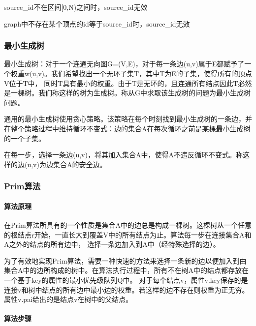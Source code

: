 \begin{DoxyItemize}
\item {\ttfamily source\+\_\+id}不在区间{\ttfamily \mbox{[}0,N)}之间时，{\ttfamily source\+\_\+id}无效
\item {\ttfamily graph}中不存在某个顶点的{\ttfamily id}等于{\ttfamily source\+\_\+id}时，{\ttfamily source\+\_\+id}无效
\end{DoxyItemize}

\subsubsection*{最小生成树}

最小生成树：对于一个连通无向图\+G=(V,E)，对于每一条边(u,v)属于\+E都赋予了一个权重w(u,v)。我们希望找出一个无环子集\+T，其中\+T为\+E的子集，使得所有的顶点\+V位于\+T中， 同时\+T具有最小的权重。由于\+T是无环的，且连通所有结点因此\+T必然是一棵树。我们称这样的树为生成树。称从\+G中求取该生成树的问题为最小生成树问题。

通用的最小生成树使用贪心策略。该策略在每个时刻找到最小生成树的一条边，并在整个策略过程中维持循环不变式：边的集合\+A在每次循环之前是某棵最小生成树的一个子集。

在每一步，选择一条边(u,v)，将其加入集合\+A中，使得\+A不违反循环不变式。称这样的边(u,v)为边集合\+A的安全边。

\subsubsection*{Prim算法}

\paragraph*{算法原理}

在\+Prim算法所具有的一个性质是集合\+A中的边总是构成一棵树。这棵树从一个任意的根结点r开始，一直长大到覆盖\+V中的所有结点为止。算法每一步在连接集合\+A和\+A之外的结点的所有边中， 选择一条边加入到\+A中（经特殊选择的边）。

为了有效地实现\+Prim算法，需要一种快速的方法来选择一条新的边以便加入到由集合\+A中的边所构成的树中。在算法执行过程中，所有不在树\+A中的结点都存放在一个基于key的属性的最小优先级队列\+Q中。 对于每个结点v，属性v.\+key保存的是连接v和树中结点的所有边中最小边的权重。若这样的边不存在则权重为正无穷。属性v.\+pai给出的是结点v在树中的父结点。

\paragraph*{算法步骤}


